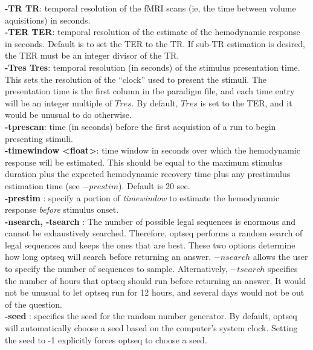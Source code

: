 \documentclass[10pt]{article}
\begin{document}
\noindent
{\bf -TR TR}: temporal resolution of the fMRI scans (ie, the time
between volume aquisitions) in seconds.\\

\noindent
{\bf -TER TER}: temporal resolution of the estimate of the hemodynamic
response in seconds. Default is to set the TER to the TR.  If sub-TR
estimation is desired, the TER must be an integer divisor of the TR.\\

\noindent
{\bf -Tres Tres}: temporal resolution (in seconds) of the stimulus
presentation time.  This sets the resolution of the ``clock'' used to
present the stimuli.  The presentation time is the first column in the
paradigm file, and each time entry will be an integer multiple of
$Tres$. By default, $Tres$ is set to the TER, and it would be unusual
to do otherwise. \\

\noindent
{\bf -tprescan}: time (in seconds) before the first acquistion of a
run to begin presenting stimuli. \\

\noindent
{\bf -timewindow <float>}: time window in seconds over which the
hemodynamic response will be estimated.  This should be equal to the
maximum stimulus duration plus the expected hemodynamic recovery time
plus any prestimulus estimation time (see $-prestim$). Default is 20
sec.\\

\noindent
{\bf -prestim }: specify a portion of {\em timewindow} to
estimate the hemodynamic response {\em before} stimulus onset.\\

\noindent
{\bf -nsearch, -tsearch }: The number of possible legal sequences is
enormous and cannot be exhaustively searched.  Therefore, optseq
performs a random search of legal sequences and keeps the ones that
are best.  These two options determine how long optseq will search
before returning an answer.  $-nsearch$ allows the user to specify the
number of sequences to sample. Alternatively, $-tsearch$ specifies the
number of hours that optseq should run before returning an answer.  It
would not be unusual to let optseq run for 12 hours, and several days
would not be out of the question.\\

\noindent
{\bf -seed }: specifies the seed for the random number generator.  By
default, optseq will automatically choose a seed based on the
computer's system clock. Setting the seed to -1 explicitly forces
optseq to choose a seed.\\
\end{document}
